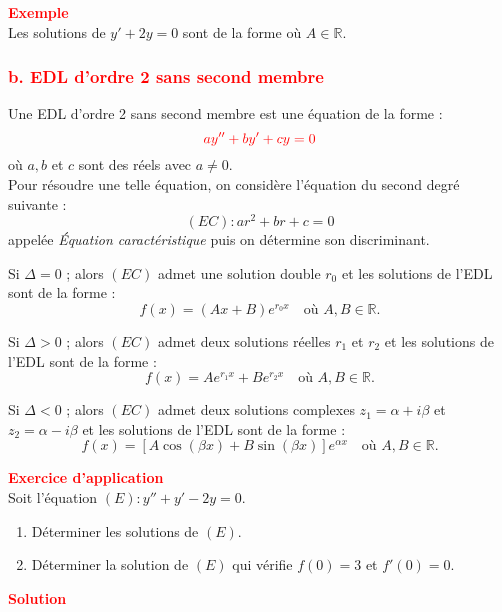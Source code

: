 \documentclass[12pt]{article}
\begin{document}
\textbf{\textcolor{red}{Exemple}}\\
Les solutions de $y' + 2y = 0$ sont de la forme  où $A \in \mathbb{R}$.

\vspace{0.5cm}

\subsubsection*{\textcolor{red}{b. EDL d’ordre 2 sans second membre}}
Une EDL d’ordre 2 sans second membre est une équation de la forme :
\[
\textcolor{red}{ay'' + by' + cy = 0}
\]
où $a, b$ et $c$ sont des réels avec $a \neq 0$.\\
Pour résoudre une telle équation, on considère l’équation du second degré suivante : 
\[
\boxed{(EC) : ar^2 + br + c = 0}
\]
appelée \textit{Équation caractéristique} puis on détermine son discriminant.

\vspace{0.5cm}

Si $\Delta = 0$ ; alors $(EC)$ admet une solution double $r_0$ et les solutions de l’EDL sont de la forme :
\[
\boxed{f(x) = (Ax + B)e^{r_0 x}} \quad \text{où } A, B \in \mathbb{R}.
\]

Si $\Delta > 0$ ; alors $(EC)$ admet deux solutions réelles $r_1$ et $r_2$ et les solutions de l’EDL sont de la forme :
\[
\boxed{f(x) = Ae^{r_1 x} + Be^{r_2 x}} \quad \text{où } A, B \in \mathbb{R}.
\]

Si $\Delta < 0$ ; alors $(EC)$ admet deux solutions complexes $z_1 = \alpha + i\beta$ et $z_2 = \alpha - i\beta$ et les solutions de l’EDL sont de la forme :
\[
\boxed{f(x) = [A\cos(\beta x) + B\sin(\beta x)]e^{\alpha x}} \quad \text{où } A, B \in \mathbb{R}.
\]

\vspace{0.5cm}

\textbf{\textcolor{red}{Exercice d'application}}\\
Soit l’équation $(E) : y'' + y' - 2y = 0$.
\begin{enumerate}
    \item Déterminer les solutions de $(E)$.
    \item Déterminer la solution de $(E)$ qui vérifie $f(0) = 3$ et $f'(0) = 0$.
\end{enumerate}

\textbf{\textcolor{red}{Solution}}
\end{document}
